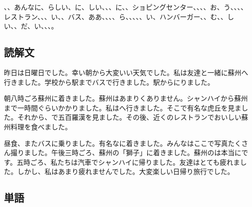 \documentclass[a5j]{ltjtarticle}
\begin{document}
\begin{onehalfspace}
  、、あんなに、らしい、に、しい、、、に、、ショピングセンター、、、、お、う、、、、レストラン、、、い、、バス、ああ、、、、ら、、、、、い、ハンバーガー、、む、、しい、、だ、い、、、。
\end{onehalfspace}

\subsection*{読解文}

\noindent\hfil{}

昨日は日曜日でした。幸い朝から大変いい天気でした。私は友達と一緒に蘇州へ行きました。学校から駅までバスで行きました。駅からにりました。

朝八時ごろ蘇州に着きました。蘇州はあまりくありません。シャンハイから蘇州まで一時間ぐらいかかりました。私はへ行きました。そこで有名な虎丘を見ました。それから、で五百羅漢を見ました。その後、近くのレストランでおいしい蘇州料理を食べました。

昼食、またバスに乗りました。有名なに着きました。みんなはここで写真たくさん撮りました。午後三時ごろ、蘇州の「獅子」に着きました。蘇州のは本当にです。五時ごろ、私たちは汽車でシャンハイに帰りました。友達はとても疲れました。しかし、私はあまり疲れませんでした。大変楽しい日帰り旅行でした。

\subsection*{単語}
\end{document}
